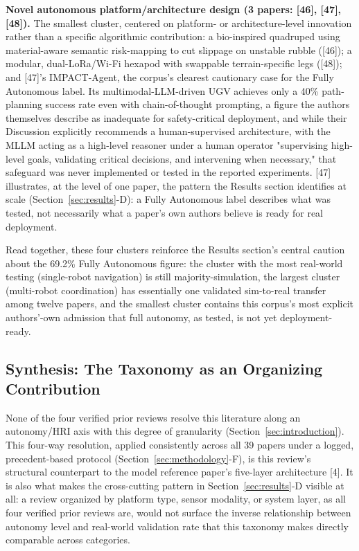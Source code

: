 \documentclass[journal]{IEEEtran}
\begin{document}
\textbf{Novel autonomous platform/architecture design (3 papers: [46], [47], [48]).} The smallest cluster, centered on platform- or architecture-level innovation rather than a specific algorithmic contribution: a bio-inspired quadruped using material-aware semantic risk-mapping to cut slippage on unstable rubble ([46]); a modular, dual-LoRa/Wi-Fi hexapod with swappable terrain-specific legs ([48]); and [47]'s IMPACT-Agent, the corpus's clearest cautionary case for the Fully Autonomous label. Its multimodal-LLM-driven UGV achieves only a 40\% path-planning success rate even with chain-of-thought prompting, a figure the authors themselves describe as inadequate for safety-critical deployment, and while their Discussion explicitly recommends a human-supervised architecture, with the MLLM acting as a high-level reasoner under a human operator "supervising high-level goals, validating critical decisions, and intervening when necessary," that safeguard was never implemented or tested in the reported experiments. [47] illustrates, at the level of one paper, the pattern the Results section identifies at scale (Section~\ref{sec:results}-D): a Fully Autonomous label describes what was tested, not necessarily what a paper's own authors believe is ready for real deployment.

Read together, these four clusters reinforce the Results section's central caution about the 69.2\% Fully Autonomous figure: the cluster with the most real-world testing (single-robot navigation) is still majority-simulation, the largest cluster (multi-robot coordination) has essentially one validated sim-to-real transfer among twelve papers, and the smallest cluster contains this corpus's most explicit authors'-own admission that full autonomy, as tested, is not yet deployment-ready.

\subsection{Synthesis: The Taxonomy as an Organizing Contribution}

None of the four verified prior reviews resolve this literature along an autonomy/HRI axis with this degree of granularity (Section~\ref{sec:introduction}). This four-way resolution, applied consistently across all 39 papers under a logged, precedent-based protocol (Section~\ref{sec:methodology}-F), is this review's structural counterpart to the model reference paper's five-layer architecture [4]. It is also what makes the cross-cutting pattern in Section~\ref{sec:results}-D visible at all: a review organized by platform type, sensor modality, or system layer, as all four verified prior reviews are, would not surface the inverse relationship between autonomy level and real-world validation rate that this taxonomy makes directly comparable across categories.
\end{document}

